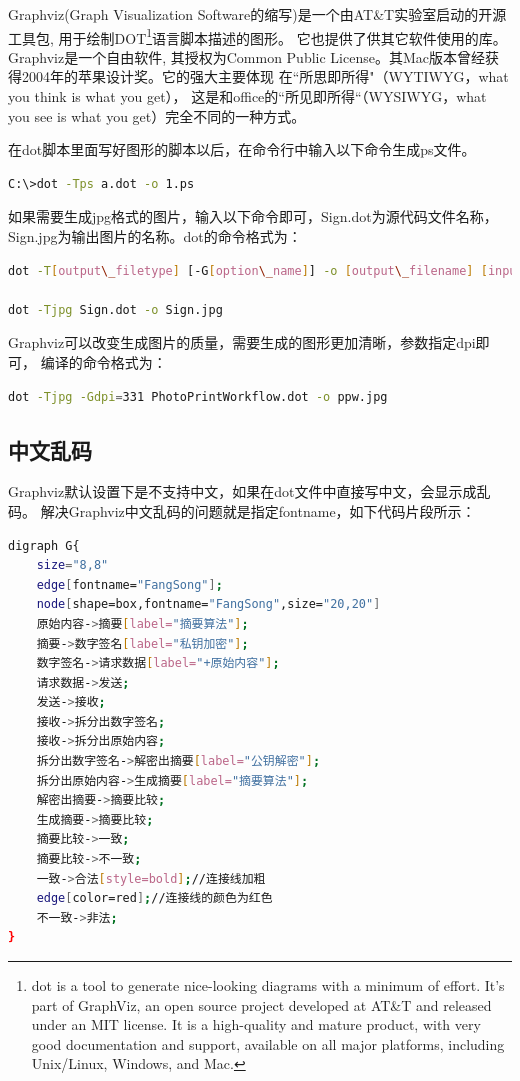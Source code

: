 \documentclass{book}
\begin{document}
Graphviz(Graph Visualization Software的缩写)是一个由AT\&T实验室启动的开源工具包,
用于绘制DOT\footnote{dot is a tool to generate nice-looking diagrams 
with a minimum of effort. It's part of GraphViz, 
an open source project developed at AT\&T and 
released under an MIT license. It is a high-quality 
and mature product, with very good documentation and 
support, available on all major platforms, 
including Unix/Linux, Windows, and Mac.}语言脚本描述的图形。
它也提供了供其它软件使用的库。Graphviz是一个自由软件,
其授权为Common Public License。其Mac版本曾经获得2004年的苹果设计奖。它的强大主要体现
在“所思即所得"（WYTIWYG，what you think is what you get），
这是和office的“所见即所得“（WYSIWYG，what you see is what you get）完全不同的一种方式。

在dot脚本里面写好图形的脚本以后，在命令行中输入以下命令生成ps文件。

\begin{lstlisting}[language=Bash]
C:\>dot -Tps a.dot -o 1.ps
\end{lstlisting}

如果需要生成jpg格式的图片，输入以下命令即可，Sign.dot为源代码文件名称，Sign.jpg为输出图片的名称。dot的命令格式为：

\begin{lstlisting}[language=Bash]
dot -T[output\_filetype] [-G[option\_name]] -o [output\_filename] [input\_filename] 

dot -Tjpg Sign.dot -o Sign.jpg
\end{lstlisting}

Graphviz可以改变生成图片的质量，需要生成的图形更加清晰，参数指定dpi即可，
编译的命令格式为：

\begin{lstlisting}[language=Bash]
dot -Tjpg -Gdpi=331 PhotoPrintWorkflow.dot -o ppw.jpg
\end{lstlisting}

\subsection{中文乱码}

Graphviz默认设置下是不支持中文，如果在dot文件中直接写中文，会显示成乱码。
解决Graphviz中文乱码的问题就是指定fontname，如下代码片段所示：

\begin{lstlisting}[language=Bash]
digraph G{
	size="8,8"
	edge[fontname="FangSong"];
	node[shape=box,fontname="FangSong",size="20,20"]	
	原始内容->摘要[label="摘要算法"];
	摘要->数字签名[label="私钥加密"];
	数字签名->请求数据[label="+原始内容"];
	请求数据->发送;	
	发送->接收;
	接收->拆分出数字签名;
	接收->拆分出原始内容;
	拆分出数字签名->解密出摘要[label="公钥解密"];
	拆分出原始内容->生成摘要[label="摘要算法"];
	解密出摘要->摘要比较;
	生成摘要->摘要比较;
	摘要比较->一致;
	摘要比较->不一致;
	一致->合法[style=bold];//连接线加粗
	edge[color=red];//连接线的颜色为红色
	不一致->非法;	
}
\end{lstlisting}
\end{document}

